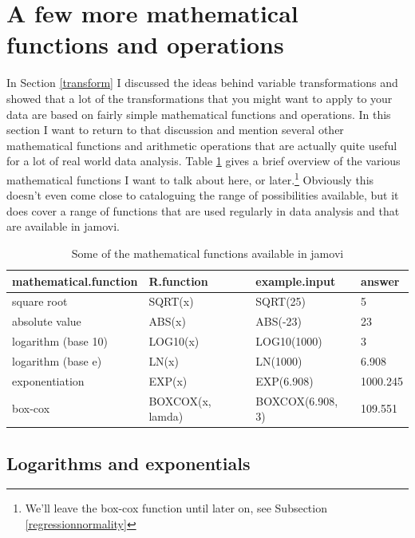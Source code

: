 \documentclass[
]{book}
\begin{document}
\hypertarget{mathfunc}{%
\section{A few more mathematical functions and operations}\label{mathfunc}}

In Section \ref{transform} I discussed the ideas behind variable transformations and showed that a lot of the transformations that you might want to apply to your data are based on fairly simple mathematical functions and operations. In this section I want to return to that discussion and mention several other mathematical functions and arithmetic operations that are actually quite useful for a lot of real world data analysis. Table \ref{tab:mathfunc} gives a brief overview of the various mathematical functions I want to talk about here, or later.\footnote{We'll leave the box-cox function until later on, see Subsection \ref{regressionnormality}} Obviously this doesn't even come close to cataloguing the range of possibilities available, but it does cover a range of functions that are used regularly in data analysis and that are available in jamovi.

\begin{table}

\caption{\label{tab:mathfunc}Some of the mathematical functions available in jamovi}
\centering
\begin{tabular}[t]{l|l|l|l}
\hline
mathematical.function & R.function & example.input & answer\\
\hline
square root & SQRT(x) & SQRT(25) & 5\\
\hline
absolute value & ABS(x) & ABS(-23) & 23\\
\hline
logarithm (base 10) & LOG10(x) & LOG10(1000) & 3\\
\hline
logarithm (base e) & LN(x) & LN(1000) & 6.908\\
\hline
exponentiation & EXP(x) & EXP(6.908) & 1000.245\\
\hline
box-cox & BOXCOX(x, lamda) & BOXCOX(6.908, 3) & 109.551\\
\hline
\end{tabular}
\end{table}

\hypertarget{logarithms-and-exponentials}{%
\subsection{Logarithms and exponentials}\label{logarithms-and-exponentials}}
\end{document}
